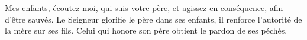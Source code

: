 Mes enfants, écoutez-moi, qui suis votre père,
	et agissez en conséquence, afin d’être sauvés.
Le Seigneur glorifie le père dans ses enfants,
	il renforce l’autorité de la mère sur ses fils.
Celui qui honore son père obtient le pardon de ses péchés.
